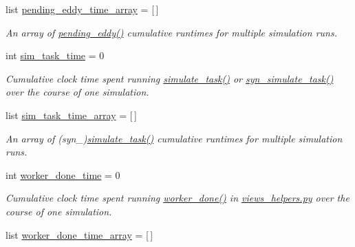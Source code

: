 \begin{DoxyCompactItemize}
list \hyperlink{classdynamicfilterapp_1_1test__simulations_1_1_simulation_test_a52b2537908d48417dca35915eadfad89}{pending\+\_\+eddy\+\_\+time\+\_\+array} = \mbox{[}$\,$\mbox{]}
\begin{DoxyCompactList}\small\item\em An array of \hyperlink{namespacedynamicfilterapp_1_1views__helpers_ad11bcb9737901ab723493b4f7fe09329}{pending\+\_\+eddy()} cumulative runtimes for multiple simulation runs. \end{DoxyCompactList}\item 
int \hyperlink{classdynamicfilterapp_1_1test__simulations_1_1_simulation_test_ab7d456049efdc5d9da3fd20938f5aa1c}{sim\+\_\+task\+\_\+time} = 0
\begin{DoxyCompactList}\small\item\em Cumulative clock time spent running \hyperlink{classdynamicfilterapp_1_1test__simulations_1_1_simulation_test_a8bed8f0f57234f8356ce3bc19606c6bf}{simulate\+\_\+task()} or \hyperlink{classdynamicfilterapp_1_1test__simulations_1_1_simulation_test_adb57a1130669e13cca7754f0a6ea040f}{syn\+\_\+simulate\+\_\+task()} over the course of one simulation. \end{DoxyCompactList}\item 
list \hyperlink{classdynamicfilterapp_1_1test__simulations_1_1_simulation_test_a0cb38299204269a784337186882a99e3}{sim\+\_\+task\+\_\+time\+\_\+array} = \mbox{[}$\,$\mbox{]}
\begin{DoxyCompactList}\small\item\em An array of (syn\+\_\+)\hyperlink{classdynamicfilterapp_1_1test__simulations_1_1_simulation_test_a8bed8f0f57234f8356ce3bc19606c6bf}{simulate\+\_\+task()} cumulative runtimes for multiple simulation runs. \end{DoxyCompactList}\item 
int \hyperlink{classdynamicfilterapp_1_1test__simulations_1_1_simulation_test_ab6da582941b08e9341e17555b8862fbd}{worker\+\_\+done\+\_\+time} = 0
\begin{DoxyCompactList}\small\item\em Cumulative clock time spent running \hyperlink{namespacedynamicfilterapp_1_1views__helpers_af27860dfe5bfa6b2b8a1b29347eb918d}{worker\+\_\+done()} in \hyperlink{views__helpers_8py}{views\+\_\+helpers.\+py} over the course of one simulation. \end{DoxyCompactList}\item 
list \hyperlink{classdynamicfilterapp_1_1test__simulations_1_1_simulation_test_afaec525ce73afa412628498ba8603b65}{worker\+\_\+done\+\_\+time\+\_\+array} = \mbox{[}$\,$\mbox{]}

\end{DoxyCompactItemize}
